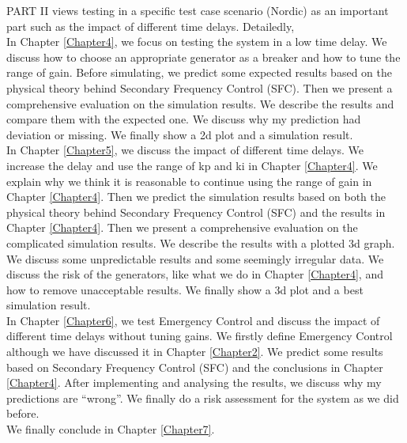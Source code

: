\documentclass{report}
\begin{document}
PART II views testing in a specific test case scenario (Nordic) as an important part such as the impact of different time delays. Detailedly,\\

In Chapter \textcolor{red}{\ref{Chapter4}}, we focus on testing the system in a low time delay. We discuss how to choose an appropriate generator as a breaker and how to tune the range of  gain. Before simulating, we predict some expected results based on the physical theory behind Secondary Frequency Control (SFC). Then we present a comprehensive evaluation on the simulation results. We describe the results and compare them with the expected one. We discuss why my prediction had deviation or missing. We finally show a 2d plot and a simulation result.\\

In Chapter \textcolor{red}{\ref{Chapter5}}, we discuss the impact of different time delays. We increase the delay and use the range of kp and ki in Chapter \textcolor{red}{\ref{Chapter4}}. We explain why we think it is reasonable to continue using the range of gain in Chapter \textcolor{red}{\ref{Chapter4}}. Then we predict the simulation results based on both the physical theory behind Secondary Frequency Control (SFC) and the results in Chapter \textcolor{red}{\ref{Chapter4}}. Then we present a comprehensive evaluation on the complicated simulation results. We describe the results with a plotted 3d graph. We discuss some unpredictable results and some seemingly irregular data. We discuss the risk of the generators, like what we do in Chapter \textcolor{red}{\ref{Chapter4}}, and how to remove unacceptable results. We  finally show a 3d plot and a best simulation result.\\

In Chapter \textcolor{red}{\ref{Chapter6}}, we test Emergency Control and discuss the impact of different time delays without tuning gains. We firstly define Emergency Control although we have discussed it in Chapter \textcolor{red}{\ref{Chapter2}}. We predict some results based on Secondary Frequency Control (SFC) and the conclusions in Chapter \textcolor{red}{\ref{Chapter4}}. After implementing and analysing the results, we discuss why my predictions are “wrong”. We finally do a risk assessment for the system as we did before.\\


We finally conclude in Chapter \textcolor{red}{\ref{Chapter7}}.\\
\end{document}
